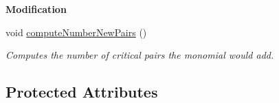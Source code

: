 \begin{Indent}\textbf{ Modification}\par
\begin{DoxyCompactItemize}
\item 
\mbox{\label{class_p_p_with_ideal_ad3df0f54a6de6a86d0c61d8a14cbaed1}} 
void \hyperlink{class_p_p_with_ideal_ad3df0f54a6de6a86d0c61d8a14cbaed1}{compute\+Number\+New\+Pairs} ()
\begin{DoxyCompactList}\small\item\em Computes the number of critical pairs the monomial would add. \end{DoxyCompactList}\end{DoxyCompactItemize}
\end{Indent}
\subsection*{Protected Attributes}
